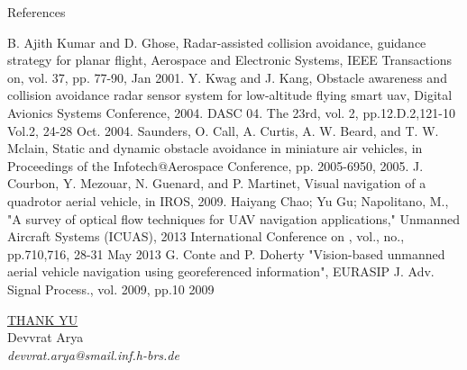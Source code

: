 \documentclass[8pt]{beamer}
\begin{document}
{{\begin{frame}{References}
  \begin{thebibliography}{10}
   B. Ajith Kumar and D. Ghose, Radar-assisted collision avoidance, guidance strategy for planar flight, Aerospace and Electronic Systems, IEEE Transactions on, vol. 37, pp. 77-90, Jan 2001.
   Y. Kwag and J. Kang, Obstacle awareness and collision avoidance radar sensor system for low-altitude flying smart uav, Digital Avionics Systems Conference, 2004. DASC 04. The 23rd, vol. 2, pp.12.D.2,121-10 Vol.2, 24-28 Oct. 2004. 
   Saunders, O. Call, A. Curtis, A. W. Beard, and T. W. Mclain, Static and dynamic obstacle avoidance in miniature air vehicles, in Proceedings of the Infotech@Aerospace Conference, pp. 2005-6950, 2005.
  J. Courbon, Y. Mezouar, N. Guenard, and P. Martinet, Visual navigation
of a quadrotor aerial vehicle, in IROS, 2009.
   Haiyang Chao; Yu Gu; Napolitano, M., "A survey of optical flow techniques for UAV navigation applications," Unmanned Aircraft Systems (ICUAS), 2013 International Conference on , vol., no., pp.710,716, 28-31 May 2013
   G. Conte and P. Doherty  "Vision-based unmanned aerial vehicle navigation using georeferenced information",  EURASIP J. Adv. Signal Process.,  vol. 2009,  pp.10 2009 
  \end{thebibliography}
\end{frame}

\begin{frame}
 \begin{center}
  \Large {\underline{THANK Y{\Laughey}U}}\\[5pt]
 \normalsize{ Devvrat Arya\\
  \textit{devvrat.arya@smail.inf.h-brs.de}}
 \end{center}
\end{frame}

}}
\end{document}
